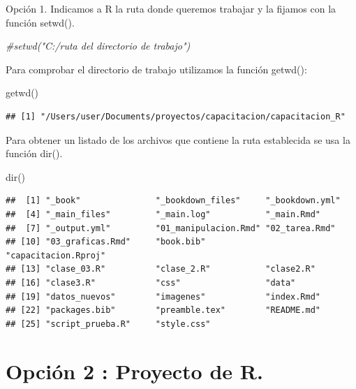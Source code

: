 \documentclass[
]{book}
\newenvironment{Shaded}{\begin{snugshade}}{\end{snugshade}}
\newcommand{\CommentTok}[1]{\textcolor[rgb]{0.56,0.35,0.01}{\textit{#1}}}
\newcommand{\FunctionTok}[1]{\textcolor[rgb]{0.00,0.00,0.00}{#1}}
\newcommand{\NormalTok}[1]{#1}
\begin{document}
Opción 1. Indicamos a R la ruta donde queremos trabajar y la fijamos con la función setwd().

\begin{Shaded}
\begin{Highlighting}[]
\CommentTok{\#setwd("C:/ruta del directorio de trabajo")}
\end{Highlighting}
\end{Shaded}

Para comprobar el directorio de trabajo utilizamos la función getwd():

\begin{Shaded}
\begin{Highlighting}[]
\FunctionTok{getwd}\NormalTok{()}
\end{Highlighting}
\end{Shaded}

\begin{verbatim}
## [1] "/Users/user/Documents/proyectos/capacitacion/capacitacion_R"
\end{verbatim}

Para obtener un listado de los archivos que contiene la ruta establecida se usa la función dir().

\begin{Shaded}
\begin{Highlighting}[]
\FunctionTok{dir}\NormalTok{()}
\end{Highlighting}
\end{Shaded}

\begin{verbatim}
##  [1] "_book"               "_bookdown_files"     "_bookdown.yml"      
##  [4] "_main_files"         "_main.log"           "_main.Rmd"          
##  [7] "_output.yml"         "01_manipulacion.Rmd" "02_tarea.Rmd"       
## [10] "03_graficas.Rmd"     "book.bib"            "capacitacion.Rproj" 
## [13] "clase_03.R"          "clase_2.R"           "clase2.R"           
## [16] "clase3.R"            "css"                 "data"               
## [19] "datos_nuevos"        "imagenes"            "index.Rmd"          
## [22] "packages.bib"        "preamble.tex"        "README.md"          
## [25] "script_prueba.R"     "style.css"
\end{verbatim}

\hypertarget{opciuxf3n-2-proyecto-de-r.}{%
\section{Opción 2 : Proyecto de R.}\label{opciuxf3n-2-proyecto-de-r.}}
\end{document}
